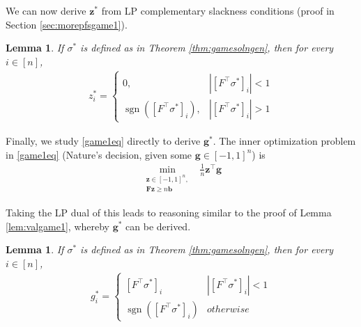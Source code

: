 \documentclass{colt2015} %
\newtheorem{lem}[thm]{Lemma}
\newcommand{\vF}{\mathbf{F}}
\newcommand{\vb}{\mathbf{b}}
\newcommand{\vg}{\mathbf{g}}
\newcommand{\vz}{\mathbf{z}}
\DeclareMathOperator{\sgn}{sgn}
\newcommand{\abs}[1]{\left| #1 \right|}
\begin{document}
We can now derive $\vz^*$ from LP complementary slackness conditions 
(proof in Section \ref{sec:morepfsgame1}).

\begin{lem}
\label{lem:game1zopt}
If $\sigma^*$ is defined as in Theorem \ref{thm:gamesolngen}, then for every $i \in [n]$,
\begin{align*}
z_i^* = 
\begin{cases} 
0, & \abs{[F^\top \sigma^*]_{i}} < 1 \\ 
\sgn([F^\top \sigma^*]_{i}), & \abs{[F^\top \sigma^*]_{i}} > 1 
\end{cases}
\end{align*}
\end{lem}


Finally, we study \eqref{game1eq} directly to derive $\vg^*$. 
The inner optimization problem in \eqref{game1eq} (Nature's decision, given some $\vg \in [-1,1]^n$) is 
\begin{align}
\label{game1innerold}
\min_{\substack{ \vz \in [-1,1]^n , \\ \vF \vz \geq n \vb }} \;\; \frac{1}{n} \vz^\top \vg
\end{align}

Taking the LP dual of this leads to reasoning  
similar to the proof of Lemma \ref{lem:valgame1}, 
whereby $\vg^*$ can be derived.

\begin{lem}
\label{lem:game1gopt}
If $\sigma^*$ is defined as in Theorem \ref{thm:gamesolngen}, then for every $i \in [n]$,
\begin{align*}
g_i^* = 
\begin{cases} [F^\top \sigma^*]_{i} & \abs{[F^\top \sigma^*]_{i}} < 1 \\ 
\sgn([F^\top \sigma^*]_{i}) & otherwise \end{cases}
\end{align*}
\end{lem}
\end{document}
